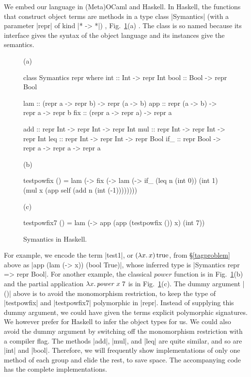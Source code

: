 We embed our language in (Meta)OCaml and Haskell.  In Haskell,
the functions that construct object terms are methods in a type class
|Symantics| (with a parameter |repr| of kind |* -> *|)%
, Fig.~\ref{fig:symantics-haskell}(a)%
. The class is so named
because its interface gives the syntax of the object language and its
instances give the semantics.
\begin{figure}
%
(a)\vspace{-10pt}
\begin{code}
class Symantics repr where
  int  :: Int  -> repr Int
  bool :: Bool -> repr Bool

  lam :: (repr a -> repr b) -> repr (a -> b)
  app :: repr (a -> b) -> repr a -> repr b
  fix :: (repr a -> repr a) -> repr a

  add :: repr Int -> repr Int -> repr Int
  mul :: repr Int -> repr Int -> repr Int
  leq :: repr Int -> repr Int -> repr Bool
  if_ :: repr Bool -> repr a -> repr a -> repr a
\end{code}
%
(b)\vspace{-10pt}
\begin{code}
testpowfix () = lam (\x -> fix (\self -> lam (\n ->
                 if_ (leq n (int 0)) (int 1)
                     (mul x (app self (add n (int (-1))))))))
\end{code}
%
(c)\vspace{-10pt}
\begin{code}
testpowfix7 () = lam (\x -> app (app (testpowfix ()) x) (int 7))
\end{code}
%
\caption{Symantics in Haskell.}
\label{fig:symantics-haskell}
\end{figure}
For example, we encode the term |test1|, or $(\mathopen{\lambda\mathord{x}.\,}x)\mathinner{\mathrm{true}}$, from
\S\ref{tagproblem} above as |app (lam (\x -> x)) (bool True)|,
whose inferred type is |Symantics repr => repr Bool|.
For another example, the classical $\mathit{power}$ function is
in Fig.~\ref{fig:symantics-haskell}(b)
and the partial application $\mathopen{\lambda\mathord{x}.\,} \mathit{power}\;x\;7$ is
in Fig.~\ref{fig:symantics-haskell}(c).
The dummy argument |()| above is to avoid the monomorphism
restriction, to keep the type of |testpowfix| and |testpowfix7|
polymorphic in |repr|. Instead of supplying this dummy
argument, we could have given the terms explicit polymorphic
signatures.  We however prefer for
Haskell to infer the object types for us. We could also
avoid the dummy argument by switching off the monomorphism restriction
with a compiler flag.
The methods |add|, |mul|, and |leq| are quite similar, and so are
|int| and |bool|. Therefore, we will frequently show implementations of
only one method of each group and elide the rest, to save space. The
accompanying code has the complete implementations.

